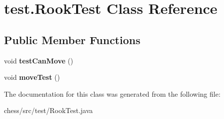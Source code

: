 \hypertarget{classtest_1_1_rook_test}{}\section{test.\+Rook\+Test Class Reference}
\label{classtest_1_1_rook_test}
\subsection*{Public Member Functions}
\begin{DoxyCompactItemize}
\item 
\mbox{\label{classtest_1_1_rook_test_aa01d919e515cdb70314d87b665961a42}} 
void {\bfseries test\+Can\+Move} ()
\item 
\mbox{\label{classtest_1_1_rook_test_a9a7ee00715bb1b29907b01c5b939a3e1}} 
void {\bfseries move\+Test} ()
\end{DoxyCompactItemize}


The documentation for this class was generated from the following file\+:\begin{DoxyCompactItemize}
\item 
chess/src/test/Rook\+Test.\+java\end{DoxyCompactItemize}
